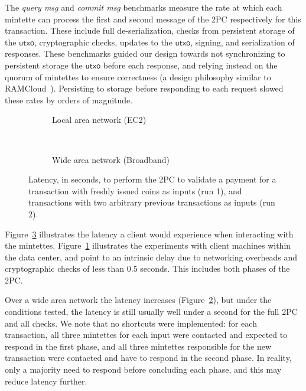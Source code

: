 \documentclass[conference]{IEEEtran}
\newcommand{\utxo}{\mathsf{utxo}}
\begin{document}
The \emph{query msg} and \emph{commit msg} benchmarks measure the
rate at which each mintette can process the first and second message of the
2PC respectively for this transaction.
These include full de-serialization, checks from persistent storage of the
$\utxo$, cryptographic checks, updates to the $\utxo$, signing, and
serialization of responses. These benchmarks guided our design towards not
synchronizing to persistent storage the $\utxo$ before each response, and
relying instead on the quorum of mintettes to ensure correctness (a design
philosophy similar to
RAMCloud~\cite{DBLP:journals/cacm/OusterhoutAEKLMMNOPRRSS11}). Persisting to
storage before
responding to each request slowed these rates by orders of magnitude.

\begin{figure}[t!]
\centering
\begin{subfigure}[b]{0.9\linewidth}
\centering
{}\fi
\caption{Local area network (EC2)}
\label{fig:lanlatency}
\end{subfigure}
~
\begin{subfigure}[b]{0.9\linewidth}
\centering
{}\fi
\caption{Wide area network (Broadband)}
\label{fig:wanlatency}
\end{subfigure}
\caption{Latency, in seconds, to perform the 2PC to validate
a payment for a transaction with freshly issued coins as inputs (run 1), and
transactions with two arbitrary previous transactions as inputs (run 2).}
\label{fig:latency}
\end{figure}

Figure~\ref{fig:latency} illustrates the latency a client would experience
when interacting with the mintettes. Figure~\ref{fig:lanlatency}
illustrates the experiments with client machines within the data center, and
point to an intrinsic delay due to networking overheads and cryptographic
checks of less than 0.5 seconds. This includes both phases of the 2PC.

Over a wide area network the latency increases (Figure~\ref{fig:wanlatency}),
but under the conditions tested, the latency
is still usually well under a second for the full 2PC and all checks.  We
note that no shortcuts were implemented: for each transaction, all three
mintettes for each input were contacted and expected to respond in the first
phase, and all three mintettes responsible for the new transaction were
contacted and have to respond in the second phase. In reality, only a majority
need to respond before concluding each phase, and this may reduce latency
further.
\end{document}
